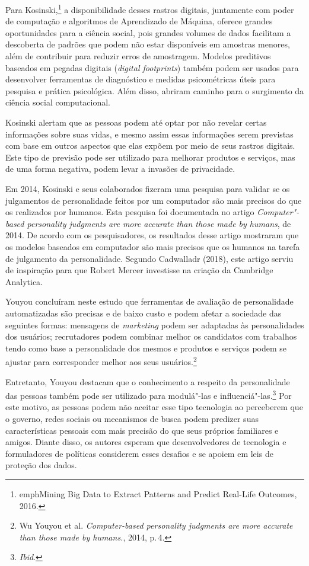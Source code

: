 Para Kosinski,\footnote{emph{Mining Big Data to Extract Patterns and Predict Real-Life
Outcomes}, 2016.} a disponibilidade desses rastros digitais,
juntamente com poder de computação e algoritmos de Aprendizado de
Máquina, oferece grandes oportunidades para a ciência social, pois
grandes volumes de dados facilitam a descoberta de padrões que podem não
estar disponíveis em amostras menores, além de contribuir para reduzir
erros de amostragem. Modelos preditivos baseados em pegadas digitais
(\emph{digital footprints}) também podem ser usados para desenvolver
ferramentas de diagnóstico e medidas psicométricas úteis para pesquisa e
prática psicológica. Além disso, abriram caminho para o surgimento da
ciência social computacional.

Kosinski alertam que as pessoas podem até optar por não
revelar certas informações sobre suas vidas, e mesmo assim essas
informações serem previstas com base em outros aspectos que elas expõem
por meio de seus rastros digitais. Este tipo de previsão pode ser
utilizado para melhorar produtos e serviços, mas de uma forma negativa,
podem levar a invasões de privacidade.

Em 2014, Kosinski e seus colaborados fizeram uma pesquisa para validar
se os julgamentos de personalidade feitos por um computador são mais
precisos do que os realizados por humanos. Esta pesquisa foi documentada
no artigo \emph{Computer"-based personality judgments are more accurate
than those made by humans}, de 2014. De acordo com os
pesquisadores, os resultados desse artigo mostraram que os modelos
baseados em computador são mais precisos que os humanos na tarefa de
julgamento da personalidade. Segundo Cadwalladr (2018), este artigo
serviu de inspiração para que Robert Mercer investisse na criação da
Cambridge Analytica.

Youyou concluíram neste estudo que ferramentas de avaliação
de personalidade automatizadas são precisas e de baixo custo e podem
afetar a sociedade das seguintes formas: mensagens de \emph{marketing} podem
ser adaptadas às personalidades dos usuários; recrutadores podem
combinar melhor os candidatos com trabalhos tendo como base a
personalidade dos mesmos e produtos e serviços podem se ajustar para
corresponder melhor aos seus usuários.\footnote{Wu Youyou et al. \emph{Computer-based personality judgments are more accurate than
those made by humans.}, 2014, p.\,4.}

Entretanto, Youyou destacam que o conhecimento a respeito
da personalidade das pessoas também pode ser utilizado para modulá"-las e
influenciá"-las.\footnote{\textit{Ibid}.} Por este motivo, as pessoas podem não aceitar esse tipo
tecnologia ao perceberem que o governo, redes sociais ou mecanismos de
busca podem predizer suas características pessoais com mais precisão do
que seus próprios familiares e amigos. Diante disso, os autores esperam
que desenvolvedores de tecnologia e formuladores de políticas considerem
esses desafios e se apoiem em leis de proteção dos dados.

